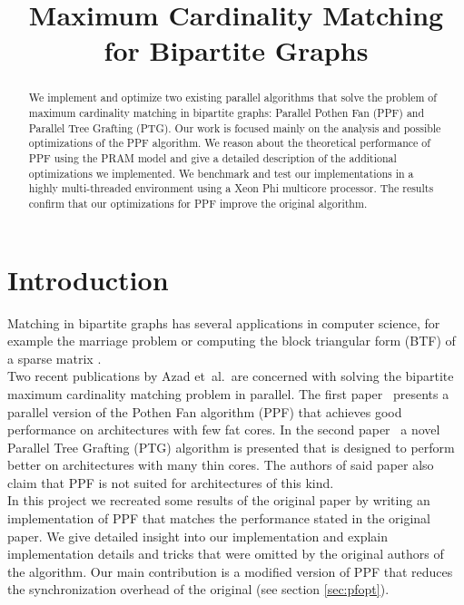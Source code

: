 \documentclass[letterpaper]{article}
\title{Maximum Cardinality Matching for Bipartite Graphs}
\begin{document}
%
\maketitle
%


\begin{abstract}

We implement and optimize two existing parallel algorithms that solve the problem of maximum cardinality matching in bipartite graphs: Parallel Pothen Fan (PPF) and Parallel Tree Grafting (PTG). Our work is focused mainly on the analysis and possible optimizations of the PPF algorithm. We reason about the theoretical performance of PPF using the PRAM model and give a detailed description of the additional optimizations we implemented. We benchmark and test our implementations in a highly multi-threaded environment using a Xeon Phi multicore processor. The results confirm that our optimizations for PPF improve the original algorithm. 

\end{abstract}

\section{Introduction}\label{sec:intro}

Matching in bipartite graphs has several applications in computer science, for example the marriage problem or computing the block triangular 
form (BTF) of a sparse matrix \cite{Pothen:1990}.\\

Two recent publications by Azad et\ al.\ are concerned with solving the bipartite maximum cardinality matching problem in parallel. 
The first paper~\cite{Azad:2012} presents a parallel version of the Pothen Fan algorithm (PPF) that achieves good performance 
on architectures with few fat cores. In the second paper~\cite{Azad:2015} a novel Parallel Tree Grafting (PTG) algorithm is presented 
that is designed to perform better on architectures with many thin cores. 
The authors of said paper also claim that PPF is not suited for architectures of this kind.\\

In this project we recreated some results of the original paper \cite{Azad:2012} by writing an implementation of PPF
that matches the performance stated in the original paper. We give detailed insight into our implementation and explain
implementation details and tricks that were omitted by the original authors of the algorithm. 
Our main contribution is a modified version of PPF that reduces the synchronization overhead of the original (see section \ref{sec:pfopt}).\\
\end{document}
